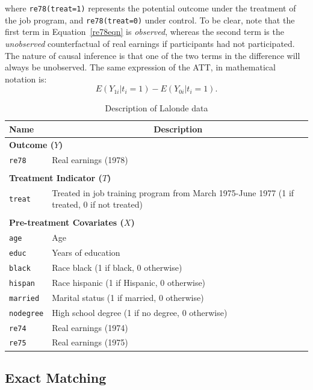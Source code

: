 \documentclass[oneside,letterpaper,titlepage]{article}
\begin{document}
\noindent where \texttt{re78(treat=1)} represents the potential
outcome under the treatment of the job program, and
\texttt{re78(treat=0)} under control.  To be clear, note that the
first term in Equation~\ref{re78eqn} is \emph{observed}, whereas the
second term is the \emph{unobserved} counterfactual of real earnings
if participants had not participated.  The nature of causal inference
is that one of the two terms in the difference will always be
unobserved.  The same expression of the ATT, in mathematical notation
is:
\begin{equation}
  E(Y_{1i} | t_i=1 ) - E(Y_{0i} | t_i=1).
\end{equation}
\begin{table}[h]
\label{dwvars}
\centering
\begin{tabular}{lp{3in}}
  \hline 
  \multicolumn{1}{l}{Name} & \multicolumn{1}{c}{Description} \\
  \hline
  \multicolumn{2}{l}{\textbf{Outcome ($Y$)}} \\ 
  \texttt{re78} & Real earnings (1978) \\\\
  \multicolumn{2}{l}{\textbf{Treatment Indicator ($T$)}} \\
  \texttt{treat} & Treated in job training program from March 1975-June
  1977 (1 if treated, 0 if not treated)
  \\ \\
  \multicolumn{2}{l}{\textbf{Pre-treatment Covariates ($X$)}} \\
  \texttt{age} & Age\\
  \texttt{educ} & Years of education \\
  \texttt{black} & Race black (1 if black, 0 otherwise) \\
  \texttt{hispan} & Race hispanic  (1 if Hispanic, 0 otherwise) \\
  \texttt{married} & Marital status (1 if married, 0 otherwise) \\
  \texttt{nodegree} & High school degree (1 if no degree, 0 otherwise)\\
  \texttt{re74} & Real earnings (1974) \\
  \texttt{re75} & Real earnings (1975) \\ 
  \hline
\end{tabular}\label{lalonde}
\caption{Description of Lalonde data}
\end{table}

\subsection{Exact Matching \label{exactm}}
\end{document}
